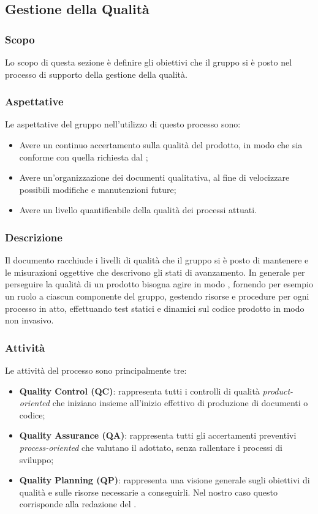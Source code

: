 \subsection{Gestione della Qualità}
\subsubsection{Scopo}
Lo scopo di questa sezione è definire gli obiettivi che il gruppo si è posto nel processo di supporto della gestione della qualità. 

\subsubsection{Aspettative}
Le aspettative del gruppo \Gruppo{} nell'utilizzo di questo processo sono:
\begin{itemize}
	\item Avere un continuo accertamento sulla qualità del prodotto, in modo che sia conforme con quella richiesta dal ;
	\item Avere un'organizzazione dei documenti qualitativa, al fine di velocizzare possibili modifiche e manutenzioni future;
	\item Avere un livello quantificabile della qualità dei processi attuati.
\end{itemize}

\subsubsection{Descrizione}
Il documento \PdQ{} racchiude i livelli di qualità che il gruppo si è posto di mantenere e le misurazioni oggettive che descrivono gli stati di avanzamento.
In generale per perseguire la qualità di un prodotto bisogna agire in modo , fornendo per esempio un ruolo a ciascun componente del gruppo, gestendo risorse e procedure per ogni processo in atto, effettuando test statici e dinamici sul codice prodotto in modo non invasivo.

\subsubsection{Attività}
Le attività del processo sono principalmente tre:
\begin{itemize}
	\item \textbf{Quality Control (QC)}: rappresenta tutti i controlli di qualità \textit{product-oriented} che iniziano insieme all'inizio effettivo di produzione di documenti o codice;
	\item \textbf{Quality Assurance (QA)}: rappresenta tutti gli accertamenti preventivi \textit{process-oriented} che valutano il  adottato, senza rallentare i processi di sviluppo;
	\item \textbf{Quality Planning (QP)}: rappresenta una visione generale sugli obiettivi di qualità e sulle risorse necessarie a conseguirli. Nel nostro caso questo corrisponde alla redazione del \PdQv{}.
\end{itemize}
	
